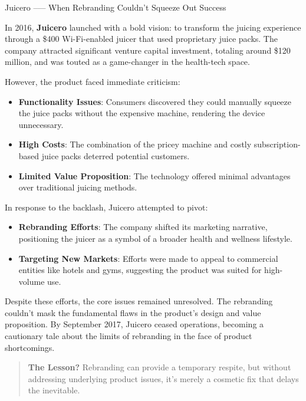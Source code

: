 \medskip


\begin{HistoricalSidebar}{Juicero --— When Rebranding Couldn't Squeeze Out Success}

In 2016, \textbf{Juicero} launched with a bold vision: to transform the juicing experience through a \$400 Wi-Fi-enabled juicer that used proprietary juice packs. The company attracted significant venture capital investment, totaling around \$120 million, and was touted as a game-changer in the health-tech space.

\medskip

However, the product faced immediate criticism:

\begin{itemize}
  \item \textbf{Functionality Issues}: Consumers discovered they could manually squeeze the juice packs without the expensive machine, rendering the device unnecessary.
  \item \textbf{High Costs}: The combination of the pricey machine and costly subscription-based juice packs deterred potential customers.
  \item \textbf{Limited Value Proposition}: The technology offered minimal advantages over traditional juicing methods.
\end{itemize}

\medskip

In response to the backlash, Juicero attempted to pivot:

\begin{itemize}
  \item \textbf{Rebranding Efforts}: The company shifted its marketing narrative, positioning the juicer as a symbol of a broader health and wellness lifestyle.
  \item \textbf{Targeting New Markets}: Efforts were made to appeal to commercial entities like hotels and gyms, suggesting the product was suited for high-volume use.
\end{itemize}

\medskip

Despite these efforts, the core issues remained unresolved. The rebranding couldn't mask the fundamental flaws in the product's design and value proposition. By September 2017, Juicero ceased operations, becoming a cautionary tale about the limits of rebranding in the face of product shortcomings.

\medskip

\begin{quote}
\textbf{The Lesson?} Rebranding can provide a temporary respite, but without addressing underlying product issues, it's merely a cosmetic fix that delays the inevitable.
\end{quote}

\end{HistoricalSidebar}
